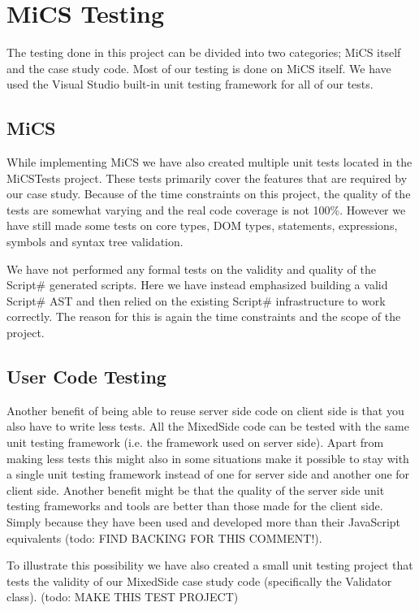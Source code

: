 \chapter{MiCS Testing}
	The testing done in this project can be divided into two categories; MiCS itself and the case study code. Most of our testing is done on MiCS itself. We have used the Visual Studio built-in unit testing framework for all of our tests.
\section{MiCS} %
\label{sec:mics}
	While implementing MiCS we have also created multiple unit tests located in the MiCSTests project. These tests primarily cover the features that are required by our case study. Because of the time constraints on this project, the quality of the tests are somewhat varying and the real code coverage is not 100\%. However we have still made some tests on core types, DOM types, statements, expressions, symbols and syntax tree validation.

	We have not performed any formal tests on the validity and quality of the Script\# generated scripts. Here we have instead emphasized building a valid Script\# AST and then relied on the existing Script\# infrastructure to work correctly. The reason for this is again the time constraints and the scope of the project.
\section{User Code Testing} %
\label{sec:user_code_testing}
	Another benefit of being able to reuse server side code on client side is that you also have to write less tests. All the MixedSide code can be tested with the same unit testing framework (i.e. the framework used on server side). Apart from making less tests this might also in some situations make it possible to stay with a single unit testing framework instead of one for server side and another one for client side. Another benefit might be that the quality of the server side unit testing frameworks and tools are better than those made for the client side. Simply because they have been used and developed more than their JavaScript equivalents (todo: FIND BACKING FOR THIS COMMENT!).

	To illustrate this possibility we have also created a small unit testing project that tests the validity of our MixedSide case study code (specifically the Validator class). (todo: MAKE THIS TEST PROJECT)

